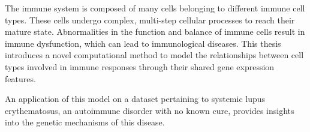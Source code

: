 The immune system is composed of many cells belonging to different immune cell types. These cells undergo complex, multi-step cellular processes to reach their mature state. Abnormalities in the function and balance of immune cells result in immune dysfunction, which can lead to immunological diseases. This thesis introduces a novel computational method to model the relationships between cell types involved in immune responses through their shared gene expression features. 

An application of this model on a dataset pertaining to systemic lupus erythematosus, an autoimmune disorder with no known cure, provides insights into the genetic mechanisms of this disease.
